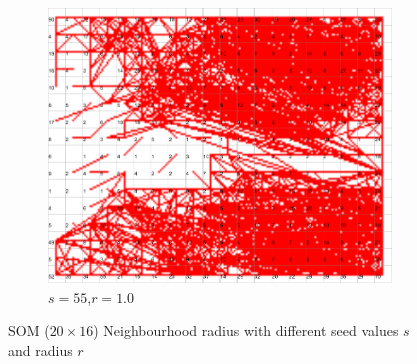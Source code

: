 \documentclass{acm_proc_article-sp}
\begin{document}
\begin{figure}
\begin{subfigure}[b]{0.30\linewidth}
        \label{fig:wine-newmid-radius-neighbourhood-graph--r-10-seed-7}
    \end{subfigure}
    \begin{subfigure}[b]{0.30\linewidth}
        \includegraphics[width=\linewidth]{img/wine-newmid-radius-neighbourhood-graph--r-10-seed-55}
        \caption{$s=55$,$r=1.0$}
        \label{fig:wine-newmid-radius-neighbourhood-graph--r-10-seed-55}
    \end{subfigure}
    \caption{SOM ($20\times16$) Neighbourhood radius with different seed values $s$ and radius $r$}
    \label{fig:wine-newmid-radius-neighbourhood-graph--r-10-seed}
\end{figure}
\end{document}
